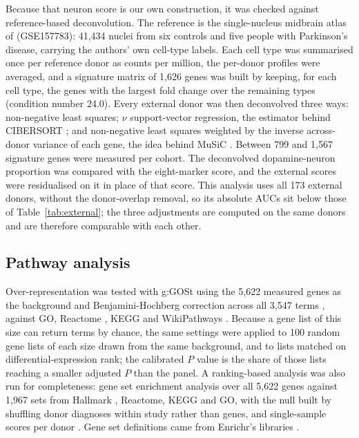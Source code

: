 \documentclass[11pt,a4paper]{article}
\begin{document}
Because that neuron score is our own construction, it was checked against reference-based deconvolution.
The reference is the single-nucleus midbrain atlas of \citet{smajic2022} (GSE157783): 41,434 nuclei from six
controls and five people with Parkinson's disease, carrying the authors' own cell-type labels. Each cell type
was summarised once per reference donor as counts per million, the per-donor profiles were averaged, and a
signature matrix of 1,626 genes was built by keeping, for each cell type, the genes with the largest fold
change over the remaining types (condition number 24.0). Every external donor was then deconvolved three
ways: non-negative least squares; $\nu$ support-vector regression, the estimator behind CIBERSORT
\citep{newman2015}; and non-negative least squares weighted by the inverse across-donor variance of each
gene, the idea behind MuSiC \citep{wang2019}. Between 799 and 1,567 signature genes were measured per cohort.
The deconvolved dopamine-neuron proportion was compared with the eight-marker score, and the external scores
were residualised on it in place of that score. This analysis uses all 173 external donors, without the
donor-overlap removal, so its absolute AUCs sit below those of Table~\ref{tab:external}; the three
adjustments are computed on the same donors and are therefore comparable with each other.

\subsection{Pathway analysis}

Over-representation was tested with g:GOSt \citep{kolberg2023} using the 5,622 measured genes as the
background and Benjamini-Hochberg correction across all 3,547 terms \citep{bh1995}, against GO, Reactome
\citep{milacic2024}, KEGG \citep{kanehisa2023} and WikiPathways \citep{agrawal2024}. Because a gene list of
this size can return terms by chance, the same settings were applied to 100 random gene lists of each size
drawn from the same background, and to lists matched on differential-expression rank; the calibrated $P$ value
is the share of those lists reaching a smaller adjusted $P$ than the panel. A ranking-based analysis was also
run for completeness: gene set enrichment analysis \citep{subramanian2005} over all 5,622 genes against 1,967
sets from Hallmark \citep{liberzon2015}, Reactome, KEGG and GO, with the null built by shuffling donor
diagnoses within study rather than genes, and single-sample scores per donor \citep{barbie2009}. Gene set
definitions came from Enrichr's libraries \citep{kuleshov2016}.
\end{document}
